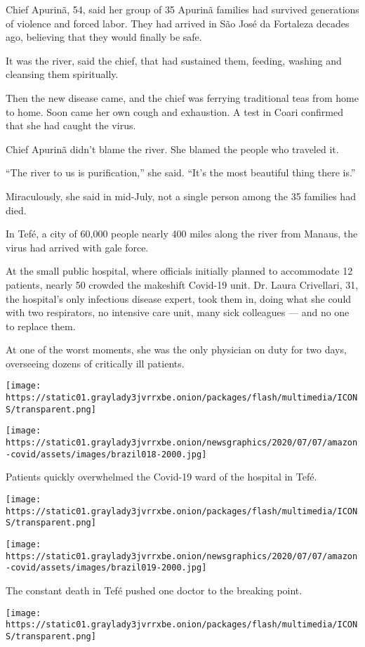 Chief Apurinã, 54, said her group of 35 Apurinã families had survived
generations of violence and forced labor. They had arrived in São José
da Fortaleza decades ago, believing that they would finally be safe.

It was the river, said the chief, that had sustained them, feeding,
washing and cleansing them spiritually.

Then the new disease came, and the chief was ferrying traditional teas
from home to home. Soon came her own cough and exhaustion. A test in
Coari confirmed that she had caught the virus.

Chief Apurinã didn't blame the river. She blamed the people who traveled
it.

``The river to us is purification,'' she said. ``It's the most beautiful
thing there is.''

Miraculously, she said in mid-July, not a single person among the 35
families had died.

In Tefé, a city of 60,000 people nearly 400 miles along the river from
Manaus, the virus had arrived with gale force.

At the small public hospital, where officials initially planned to
accommodate 12 patients, nearly 50 crowded the makeshift Covid-19 unit.
Dr. Laura Crivellari, 31, the hospital's only infectious disease expert,
took them in, doing what she could with two respirators, no intensive
care unit, many sick colleagues --- and no one to replace them.

At one of the worst moments, she was the only physician on duty for two
days, overseeing dozens of critically ill patients.

\texttt{[image: https://static01.graylady3jvrrxbe.onion/packages/flash/multimedia/ICONS/transparent.png]}

\texttt{[image: https://static01.graylady3jvrrxbe.onion/newsgraphics/2020/07/07/amazon-covid/assets/images/brazil018-2000.jpg]}

Patients quickly overwhelmed the Covid-19 ward of the hospital in Tefé.

\texttt{[image: https://static01.graylady3jvrrxbe.onion/packages/flash/multimedia/ICONS/transparent.png]}

\texttt{[image: https://static01.graylady3jvrrxbe.onion/newsgraphics/2020/07/07/amazon-covid/assets/images/brazil019-2000.jpg]}

The constant death in Tefé pushed one doctor to the breaking point.

\texttt{[image: https://static01.graylady3jvrrxbe.onion/packages/flash/multimedia/ICONS/transparent.png]}


